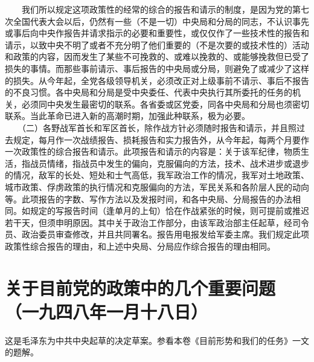 \documentclass[cn,11pt,chinese]{elegantbook}
\def\myformat#1{\hfil\hfil #1}
\begin{document}
　　我们所以规定这项政策性的经常的综合的报告和请示的制度，是因为党的第七次全国代表大会以后，仍然有一些（不是一切）中央局和分局的同志，不认识事先或事后向中央作报告并请求指示的必要和重要性，或仅仅作了一些技术性的报告和请示，以致中央不明了或者不充分明了他们重要的（不是次要的或技术性的）活动和政策的内容，因而发生了某些不可挽救的、或难以挽救的、或能够挽救但已受了损失的事情。而那些事前请示、事后报告的中央局或分局，则避免了或减少了这样的损失。从今年起，全党各级领导机关，必须改正对上级事前不请示、事后不报告的不良习惯。各中央局和分局是受中央委任、代表中央执行其所委托的任务的机关，必须同中央发生最密切的联系。各省委或区党委，同各中央局和分局也须密切联系。当此革命已进入新的高潮时期，加强此种联系，极为必要。\\
　　（二）各野战军首长和军区首长，除作战方针必须随时报告和请示，并且照过去规定，每月作一次战绩报告、损耗报告和实力报告外，从今年起，每两个月要作一次政策性的综合报告和请示。此项报告和请示的内容是：关于该军纪律，物质生活，指战员情绪，指战员中发生的偏向，克服偏向的方法，技术、战术进步或退步的情况，敌军的长处、短处和士气高低，我军政治工作的情况，我军对土地政策、城市政策、俘虏政策的执行情况和克服偏向的方法，军民关系和各阶层人民的动向等。此项报告的字数、写作方法以及发报时间，和各中央局、分局报告的办法相同。如规定的写报告时间（逢单月的上旬）恰在作战紧张的时候，则可提前或推迟若干天，但须申明原因。其中关于政治工作部分，由该军政治部主任起草，经司令员、政治委员审查修改，并且共同署名。报告用电报发给军委主席。我们规定此项政策性综合报告的理由，和上述中央局、分局应作综合报告的理由相同。\\
\newpage\section*{\myformat{关于目前党的政策中的几个重要问题}\\\myformat{（一九四八年一月十八日）}}
\begin{introduction}\item  这是毛泽东为中共中央起草的决定草案。参看本卷《目前形势和我们的任务》一文的题解。\end{introduction}
\end{document}
